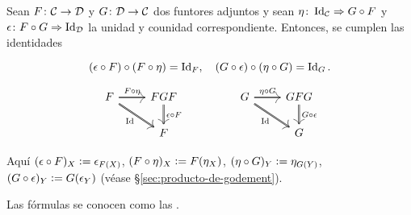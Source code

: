 \documentclass{article}
\numberwithin{equation}{section}
\theoremstyle{definition}
\begin{document}
\begin{proposicion}
  Sean $F\colon \mathcal{C}\to\mathcal{D}$ y $G\colon \mathcal{D}\to\mathcal{C}$ dos
  funtores adjuntos y sean $\eta\colon \operatorname{Id}_\mathcal{C} \Rightarrow G\circ F$ y
  $\epsilon\colon F\circ G\Rightarrow \operatorname{Id}_\mathcal{D}$ la unidad y counidad
  correspondiente. Entonces, se cumplen las identidades

  \begin{equation}
    \label{eqn:identidades-triangulares}
    (\epsilon\circ F)\circ (F\circ \eta) = \operatorname{Id}_F, \quad
    (G\circ \epsilon)\circ (\eta\circ G) = \operatorname{Id}_G.
  \end{equation}

  \begin{equation}
    \label{eqn:identidades-triangulares-diag}
    \begin{tikzcd}
      F \ar[double,->]{r}{F\circ\eta}\ar[double,->]{dr}[swap]{\Id} & FGF\ar[double,->]{d}{\epsilon\circ F} & & G \ar[double,->]{r}{\eta\circ G}\ar[double,->]{dr}[swap]{\Id} & GFG\ar[double,->]{d}{G\circ \epsilon} \\
      & F && & G
    \end{tikzcd}
  \end{equation}

  Aquí $(\epsilon\circ F)_X \mathrel{\mathop:}= \epsilon_{F (X)}$,
  $(F\circ \eta)_X \mathrel{\mathop:}= F (\eta_X)$, $(\eta\circ G)_Y \mathrel{\mathop:}= \eta_{G (Y)}$,
  $(G\circ\epsilon)_Y \mathrel{\mathop:}= G (\epsilon_Y)$ (véase
  \S\ref{sec:producto-de-godement}).
\end{proposicion}

Las fórmulas  se conocen como las
.
\end{document}
